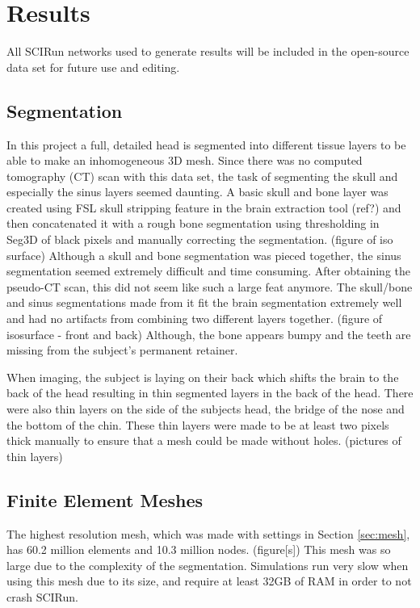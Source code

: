 %

\section{Results}
\label{sec:results}

All SCIRun networks used to generate results will be included in the open-source data set for future use and editing.

\subsection{Segmentation}

In this project a full, detailed head is segmented into different tissue layers to be able to make an inhomogeneous 3D mesh. Since there was no computed tomography (CT) scan with this data set, the task of segmenting the skull and especially the sinus layers seemed daunting. A basic skull and bone layer was created using FSL skull stripping feature in the brain extraction tool (ref?) and then concatenated it with a rough bone segmentation using thresholding in Seg3D of black pixels and manually correcting the segmentation. (figure of iso surface) Although a skull and bone segmentation was pieced together, the sinus segmentation seemed extremely difficult and time consuming. After obtaining the pseudo-CT scan, this did not seem like such a large feat anymore. The skull/bone and sinus segmentations made from it fit the brain segmentation extremely well and had no artifacts from combining two different layers together. (figure of isosurface - front and back) Although, the bone appears bumpy and the teeth are missing from the subject's permanent retainer.

When imaging, the subject is laying on their back which shifts the brain to the back of the head resulting in thin segmented layers in the back of the head. There were also thin layers on the side of the subjects head, the bridge of the nose and the bottom of the chin. These thin layers were made to be at least two pixels thick manually to ensure that a mesh could be made without holes. (pictures of thin layers)

\subsection{Finite Element Meshes}

The highest resolution mesh, which was made with settings in Section \ref{sec:mesh}, has 60.2 million elements and 10.3 million nodes. (figure[s]) This mesh was so large due to the complexity of the segmentation. Simulations run very slow when using this mesh due to its size, and require at least 32GB of RAM in order to not crash SCIRun. 

